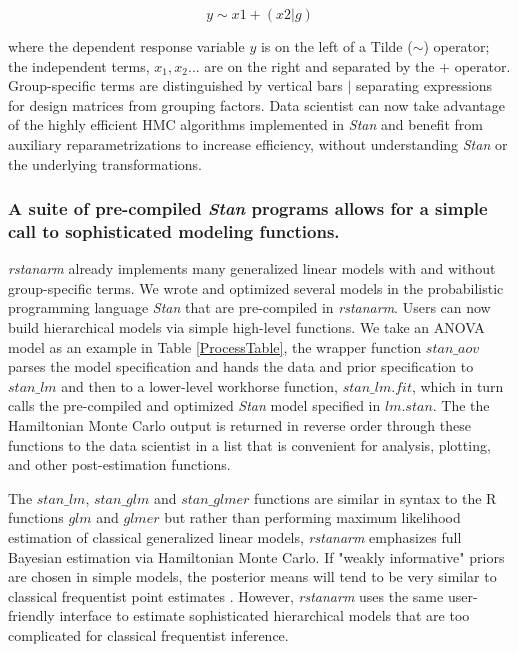 \documentclass[11pt,notitlepage]{article}
\begin{document}
\begin{figure}
\vspace{-30pt}
\begin{equation}
y \sim x1 +(x2|g)
\end{equation}
\vspace{-40pt}
\end{figure}

where the dependent response variable $y$ is on the left of a Tilde ($\sim$) operator; 
the independent terms, $x_1, x_2...$ are on the right and separated by the $+$ 
operator. Group-specific terms are distinguished by vertical bars $|$ separating expressions for design matrices from grouping factors. Data 
scientist can now take advantage of the highly efficient HMC algorithms implemented in \textit{Stan} and benefit from auxiliary reparametrizations to 
increase efficiency, without understanding \textit{Stan} or the underlying transformations.

\subsubsection*{A suite of pre-compiled \textit{Stan} programs allows for a simple call to sophisticated modeling functions.} 
\textit{rstanarm} already implements many generalized linear 
models with and without group-specific terms. We wrote and optimized several models 
in the probabilistic programming language \textit{Stan} that are
pre-compiled in \textit{rstanarm}. Users can now build hierarchical models via simple high-level functions. 
We take an ANOVA model as an example in Table \ref{ProcessTable}, the wrapper function $stan\_aov$ parses the 
model specification and hands the data and prior specification to $stan\_lm$ and 
then to a lower-level workhorse function, $stan\_lm.fit$, which in turn 
calls the pre-compiled and optimized \textit{Stan} model specified in 
$lm.stan$. The the Hamiltonian Monte Carlo output is returned in reverse order
through these functions to the data scientist in a list that is convenient 
for analysis, plotting, and other post-estimation functions.

The $stan\_lm$, $stan\_glm$ and $stan\_glmer$ functions are similar in syntax to the R functions $glm$ 
and $glmer$ but rather than performing maximum likelihood estimation of classical generalized linear models, 
\textit{rstanarm} emphasizes full Bayesian estimation via Hamiltonian Monte Carlo. If "weakly informative" 
priors are chosen in simple models, the posterior means will tend to be very similar to classical frequentist point 
estimates \cite{Gelman-Hill_2014}. However, \textit{rstanarm} uses the same user-friendly interface to estimate 
sophisticated hierarchical models that are too complicated for classical frequentist inference.
\end{document}
